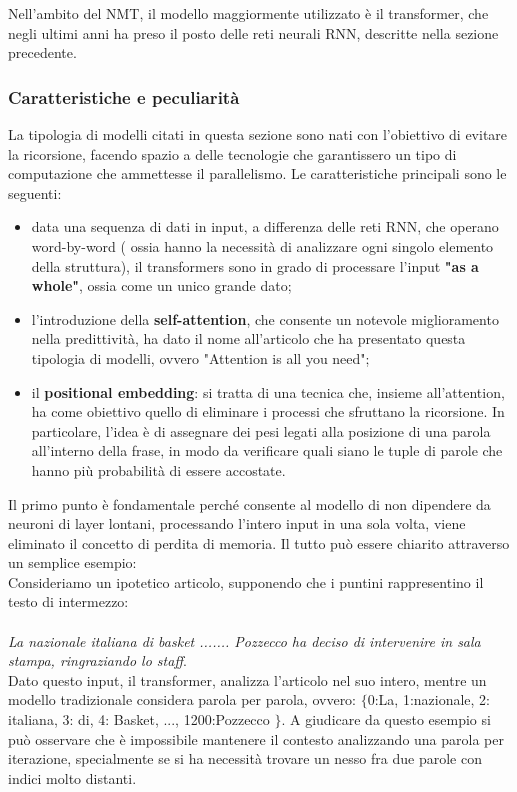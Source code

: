 Nell'ambito del NMT, il modello maggiormente utilizzato è il transformer, che negli ultimi anni ha preso il posto delle reti neurali RNN, descritte nella sezione precedente. 

\subsubsection{Caratteristiche e peculiarità}

La tipologia di modelli citati in questa sezione sono nati con l'obiettivo di evitare la ricorsione, facendo spazio a delle tecnologie che garantissero un tipo di computazione che ammettesse il parallelismo. Le caratteristiche principali sono le seguenti:
\begin{itemize}
	\item data una sequenza di dati in input, a differenza delle reti RNN, che operano word-by-word ( ossia hanno la necessità di analizzare ogni singolo elemento della struttura), il transformers sono in grado di processare l'input \textbf{"as a whole"}, ossia come un unico grande dato;
	\item l'introduzione della \textbf{self-attention}, che consente un notevole miglioramento nella predittività, ha dato il nome all'articolo che ha presentato questa tipologia di modelli, ovvero "Attention is all you need";
	\item il \textbf{positional embedding}: si tratta di una tecnica che, insieme all'attention, ha come obiettivo quello di eliminare i processi che sfruttano la ricorsione. In particolare, l'idea è di assegnare dei pesi legati alla posizione di una parola all'interno della frase, in modo da verificare quali siano le tuple di parole che hanno più probabilità di essere accostate.
\end{itemize}

Il primo punto è fondamentale perché consente al modello di non dipendere da neuroni di layer lontani, processando l'intero input in una sola volta, viene eliminato il concetto di perdita di memoria. Il tutto può essere chiarito attraverso un semplice esempio:
\\
Consideriamo un ipotetico articolo, supponendo che i puntini rappresentino il testo di intermezzo: 
\\\\ \textit{La nazionale italiana di basket ....... Pozzecco ha deciso di intervenire in sala stampa, ringraziando lo staff}.\\

Dato questo input, il transformer, analizza l'articolo nel suo intero, mentre un modello tradizionale considera parola per parola, ovvero: $\{$0:La, 1:nazionale, 2: italiana, 3: di, 4: Basket, ..., 1200:Pozzecco $\}$. A giudicare da questo esempio si può osservare che è impossibile mantenere il contesto analizzando una parola per iterazione, specialmente se si ha necessità trovare un nesso fra due parole con indici molto distanti. 
 
